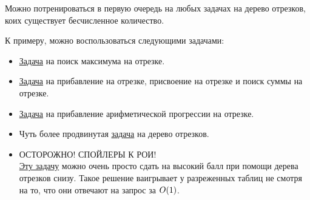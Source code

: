 Можно потренироваться в первую очередь на любых задачах на дерево отрезков, коих существует бесчисленное количество.

К примеру, можно воспользоваться следующими задачами:

\begin{itemize}
    \item \href{https://informatics.msk.ru/mod/statements/view.php?id=597&chapterid=752#1}{Задача} на поиск максимума на отрезке.

    \item \href{https://cses.fi/problemset/task/1735}{Задача} на прибавление на отрезке, присвоение на отрезке и поиск суммы на отрезке.

    \item \href{https://cses.fi/problemset/task/1736}{Задача} на прибавление арифметической прогрессии на отрезке.

    \item Чуть более продвинутая \href{https://codeforces.com/contest/446/problem/C}{задача} на дерево отрезков.

    \item ОСТОРОЖНО! СПОЙЛЕРЫ К РОИ!\\\href{https://contest.yandex.ru/roiarchive/contest/4284/problems/7/}{Эту задачу} можно очень просто сдать на высокий балл при помощи дерева отрезков снизу. Такое решение ваигрывает у разреженных таблиц не смотря на то, что они отвечают на запрос за $O(1)$.   
\end{itemize}



